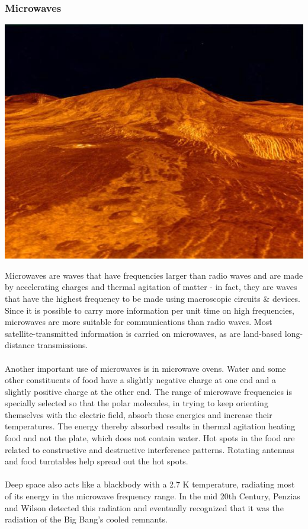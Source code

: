 \documentclass[11pt]{article}
\begin{document}
\subsubsection*{Microwaves}
\begin{center}
	\includegraphics[scale=0.3]{microwave}
\end{center}
Microwaves are waves that have frequencies larger than radio waves and are made by accelerating charges and thermal agitation of matter - in fact, they are waves that have the highest frequency to be made using macroscopic circuits \& devices. Since it is possible to carry more information per unit time on high frequencies, microwaves are more suitable for communications than radio waves. Most satellite-transmitted information is carried on microwaves, as are land-based long-distance transmissions. \\ \\
Another important use of microwaves is in microwave ovens. Water and some other constituents of food have a slightly negative charge at one end and a slightly positive charge at the other end. The range of microwave frequencies is specially selected so that the polar molecules, in trying to keep orienting themselves with the electric field, absorb these energies and increase their temperatures. The energy thereby absorbed results in thermal agitation heating food and not the plate, which does not contain water. Hot spots in the food are related to constructive and destructive interference patterns. Rotating antennas and food turntables help spread out the hot spots. \\ \\
Deep space also acts like a blackbody with a 2.7 K temperature, radiating most of its energy in the microwave frequency range. In the mid 20th Century, Penzias and Wilson detected this radiation and eventually recognized that it was the radiation of the Big Bang’s cooled remnants.
\end{document}
